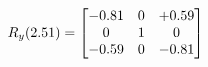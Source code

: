 \documentclass[preview]{standalone}
\begin{document}
\begin{align*}
\special{dvisvgm:raw <g id='unique000'>}R_{y}(2.51) = \begin{bmatrix}-0.81 & 0 & +0.59 \\0 & 1 & 0 \\-0.59 & 0 & -0.81\end{bmatrix}\special{dvisvgm:raw </g>}
\end{align*}
\end{document}
